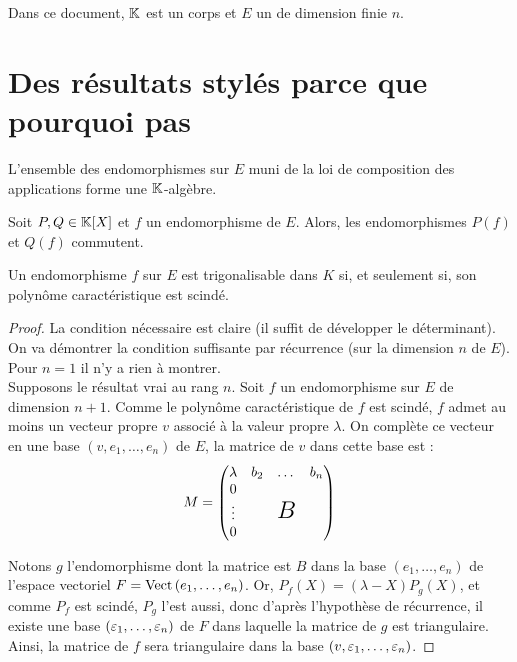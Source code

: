 \documentclass{article}
\begin{document}
Dans ce document, $\mathbb{K}$ est un corps et $E$ un \Kev de dimension finie $n$.

\section{Des résultats stylés parce que pourquoi pas}

\begin{lem}
L'ensemble des endomorphismes sur $E$ muni de la loi de composition des applications forme une $\mathbb{K}$-algèbre.
\end{lem}

\begin{lem}
Soit $P, Q \in \mathbb{K}[X]$ et $f$ un endomorphisme de $E$. Alors, les endomorphismes $P(f)$ et $Q(f)$ commutent.
\end{lem}

\begin{thm}[Trigonalisation]
Un endomorphisme $f$ sur $E$ est trigonalisable dans $K$ si, et seulement si, son polynôme caractéristique est scindé.
\end{thm}

\begin{proof}
La condition nécessaire est claire (il suffit de développer le déterminant). On va démontrer la condition suffisante par récurrence 
(sur la dimension $n$ de $E$). \\ 
Pour $n=1$ il n'y a rien à montrer. \\
Supposons le résultat vrai au rang $n$. Soit $f$ un endomorphisme sur $E$ de dimension $n+1$. 
Comme le polynôme caractéristique de $f$ est scindé, $f$ admet au moins un vecteur propre $v$ associé à la valeur propre $\lambda$. 
On complète ce vecteur en une base $(v, e_1, \dots, e_n)$ de $E$, la matrice de $v$ dans cette base est :
\[ M = \begin{pmatrix}
\lambda & \begin{matrix} b_2 & \dots & b_n \end{matrix} \\
\begin{matrix} 0 \\ \vdots \\ 0 \end{matrix}  &
  \begin{matrix}
  \hspace*{-\arraycolsep}
  \phantom{b_2} & \phantom{\dots} & \phantom{b_n}
  \hspace*{-\arraycolsep}
  \\
  & \raisebox{-0.2\height}[0pt][0pt]{\LARGE$B$} & \\
  & &
  \end{matrix}
\end{pmatrix} \]

Notons $g$ l'endomorphisme dont la matrice est $B$ dans la base $(e_1, \dots, e_n)$ de l'espace vectoriel $F=\operatorname{Vect}{(e_1, \dots, e_n)}$.
Or, $P_f(X) = (\lambda-X) P_g(X)$, et comme $P_f$ est scindé, $P_g$ l'est aussi, donc d'après l'hypothèse de récurrence, il existe une base
$(\varepsilon_1, \dots, \varepsilon_n)$ de $F$ dans laquelle la matrice de $g$ est triangulaire. 
Ainsi, la matrice de $f$ sera triangulaire dans la base $(v, \varepsilon_1, \dots, \varepsilon_n)$.
\end{proof}
\end{document}
